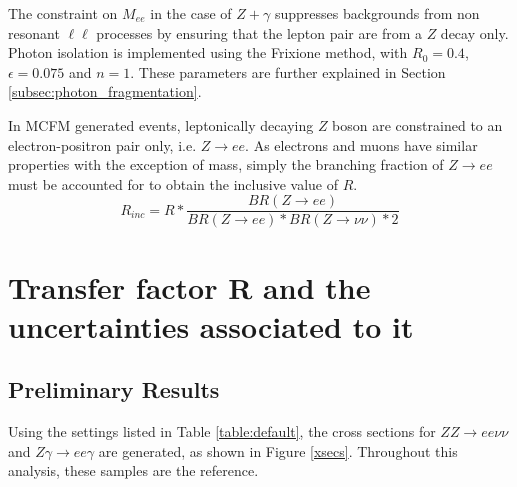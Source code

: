 \documentclass[11pt,a4paper,openright,twoside]{report}
\begin{document}
The constraint on $M_{ee}$ in the case of $Z+\gamma$ suppresses backgrounds from non resonant $\ell\ell$ processes by ensuring that the lepton pair are from a $Z$ decay only. Photon isolation is implemented using the Frixione \cite{frixione} method, with $R_0=0.4$, $\epsilon=0.075$ and $n=1$. These parameters are further explained in Section \ref{subsec:photon_fragmentation}.

In MCFM generated events, leptonically decaying $Z$ boson are constrained to an electron-positron pair only, i.e. $Z\to ee$. As electrons and muons have similar properties with the exception of mass, simply the branching fraction of $Z\rightarrow ee$ must be accounted for to obtain the inclusive value of $R$.
\begin{equation}\label{eq:R_inc}
	R_{inc} = R * \frac{BR(Z\rightarrow ee)}{BR(Z \rightarrow ee)*BR(Z\rightarrow \nu\nu)*2}
\end{equation}

\chapter{Transfer factor R and the uncertainties associated to it}\label{ch:Results}

\section{Preliminary Results}
Using the settings listed in Table \ref{table:default}, the cross sections for $ZZ\to ee\nu\nu$ and $Z\gamma\to ee\gamma$ are generated, as shown in Figure \ref{xsecs}. Throughout this analysis, these samples are the reference.
\end{document}
